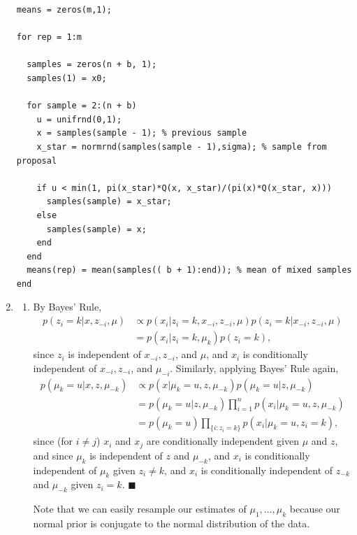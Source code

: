 \documentclass[11pt]{article}
\renewcommand{\qed}{\quad \ensuremath{\blacksquare}}
\begin{document}
\begin{enumerate}
\begin{verbatim}
means = zeros(m,1);

for rep = 1:m

  samples = zeros(n + b, 1);
  samples(1) = x0;

  for sample = 2:(n + b)
    u = unifrnd(0,1);
    x = samples(sample - 1); % previous sample
    x_star = normrnd(samples(sample - 1),sigma); % sample from proposal

    if u < min(1, pi(x_star)*Q(x, x_star)/(pi(x)*Q(x_star, x)))
      samples(sample) = x_star;
    else
      samples(sample) = x;
    end
  end
  means(rep) = mean(samples(( b + 1):end)); % mean of mixed samples
end
\end{verbatim}
\newpage
\item
\begin{enumerate}
\item By Bayes' Rule,
\begin{align*}
p(z_i = k | x, z_{-i}, \mu)
 &  \propto p(x_i | z_i = k,x_{-i},z_{-i},\mu) p(z_i = k | x_{-i},z_{-i},\mu)\\
 &  = p(x_i | z_i = k,\mu_k) p(z_i = k),
\end{align*}
since $z_i$ is independent of $x_{-i}, z_{-i}$, and $\mu$, and
$x_i$ is conditionally independent of $x_{-i}, z_{-i}$, and $\mu_{-i}$.
Similarly, applying Bayes' Rule again,
\begin{align*}
p(\mu_k = u | x,z,\mu_{-k})
 &  \propto p(x | \mu_k = u,z,\mu_{-k})p(\mu_k = u | z,\mu_{-k})    \\
 &  = p(\mu_k = u | z,\mu_{-k}) \prod_{i = 1}^n p(x_i | \mu_k = u,z,\mu_{-k})\\
 &  = p(\mu_k = u) \prod_{\{i : z_i = k\}} p(x_i | \mu_k = u,z_i = k),
\end{align*}
since (for $i \neq j$) $x_i$ and $x_j$ are conditionally independent given
$\mu$ and $z$, and since $\mu_k$ is independent of $z$ and $\mu_{-k}$, and
$x_i$ is conditionally independent of $\mu_k$ given $z_i \neq k$, and $x_i$ is
conditionally independent of $z_{-k}$ and $\mu_{-k}$ given $z_i = k$. \qed

Note that we can easily resample our estimates of $\mu_1,\dots,\mu_k$ because
our normal prior is conjugate to the normal distribution of the data.


\end{enumerate}
\end{enumerate}
\end{document}
